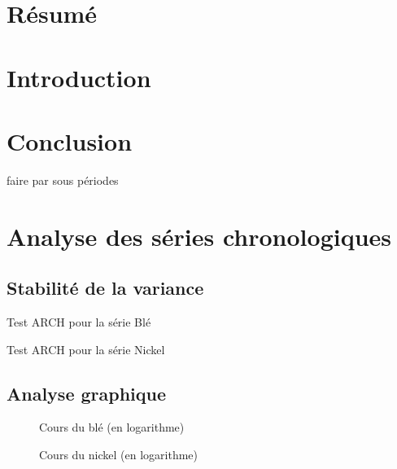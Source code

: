 \documentclass[12pt,a4paper]{article}
\begin{document}
\clearpage
{}
\pagestyle{fancy}
\fancyhead{}
\fancyfoot[C]{\thepage}
\section*{Résumé}
\renewcommand\contentsname{Sommaire}
\tableofcontents



\section*{Introduction}






\section*{Conclusion}


faire par sous périodes


\appendix
\renewcommand{\thetable}{\thesection.\arabic{table}}
\renewcommand{\thefigure}{\thesection.\arabic{figure}}
\section{Analyse des séries chronologiques}
\setcounter{table}{0}
\setcounter{figure}{0}
\subsection{Stabilité de la variance}\label{appendix:hetero}
\begin{table}[H]
    \centering
    \caption{Test ARCH pour la série Blé}
    \sffamily
    \label{tab:hetero_ble}
    
\end{table}

\begin{table}[H]
    \centering
    \caption{Test ARCH pour la série Nickel}
    \sffamily
    \label{tab:hetero_nickel}
    
\end{table}

\subsection{Analyse graphique}\label{appendix:loggraph}
\begin{figure}[H]
    \centering
    \label{fig:ble_log}
    \resizebox{0.8\textwidth}{!}{}
    \caption{Cours du blé (en logarithme)}
\end{figure}
\begin{figure}[H]
    \centering
    \label{fig:nickel_log}
    \resizebox{0.8\textwidth}{!}{}
    \caption{Cours du nickel (en logarithme)}
\end{figure}
\end{document}

